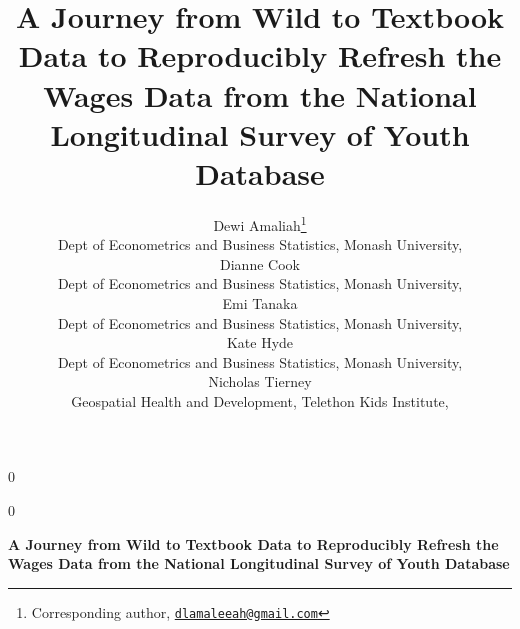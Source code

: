 \documentclass[12pt]{article}
\newcommand{\blind}{0}
\def\spacingset#1{\renewcommand{\baselinestretch}%
{#1}\small\normalsize} \spacingset{1}
\begin{document}
%

\def\spacingset#1{\renewcommand{\baselinestretch}%
{#1}\small\normalsize} \spacingset{1}



\blind
{
  \title{\bf A Journey from Wild to Textbook Data to Reproducibly Refresh the Wages Data from the National Longitudinal Survey of Youth Database}
  \author{
            Dewi Amaliah\thanks{Corresponding author, \href{mailto:dlamaleeah@gmail.com}{\nolinkurl{dlamaleeah@gmail.com}}}\\
      Dept of Econometrics and Business Statistics, Monash University, \\
            Dianne Cook\\
      Dept of Econometrics and Business Statistics, Monash University, \\
            Emi Tanaka\\
      Dept of Econometrics and Business Statistics, Monash University, \\
            Kate Hyde\\
      Dept of Econometrics and Business Statistics, Monash University, \\
            Nicholas Tierney\\
      Geospatial Health and Development, Telethon Kids Institute, }
        \maketitle
} \fi

\blind
{
  \bigskip
  \bigskip
  \bigskip
  \begin{center}
    {\LARGE\bf A Journey from Wild to Textbook Data to Reproducibly Refresh the Wages Data from the National Longitudinal Survey of Youth Database}
\end{center}
  \medskip
} \fi
\end{document}

